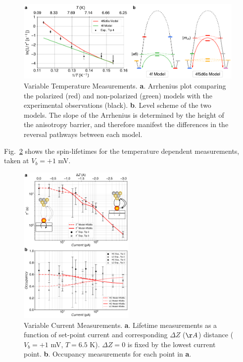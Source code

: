 \documentclass[
reprint,amsmath,amssymb,aps]{revtex4-2}
\begin{document}
\begin{figure}[h!]
\includegraphics[width=0.99\textwidth]{Fig3_new.pdf}
\caption{Variable Temperature Measurements. \textbf{a}. Arrhenius plot comparing the polarized (red) and non-polarized (green) models with the experimental observations (black). \textbf{b}. Level scheme of the two models. The slope of the Arrhenius is determined by the height of the anisotropy barrier, and therefore manifest the differences in the reversal pathways between each model. 
\label{fig:temp} }
\end{figure}
Fig.~\ref{fig:current} shows the spin-lifetimes for the temperature dependent measurements, taken at $V_{b} = +1$ mV.


\begin{figure}[h!]
\includegraphics[width=0.5\textwidth]{Fig5_new.pdf}
\caption{Variable Current Measurements. \textbf{a}. Lifetime measurements as a function of set-point current and corresponding $\Delta Z$ ($\AA$) distance ($V_{b} = +1$ mV, $T = 6.5$ K). $\Delta Z = 0$ is fixed by the lowest current point. \textbf{b}. Occupancy measurements for each point in \textbf{a}.
\label{fig:current} }
\end{figure}
\end{document}
